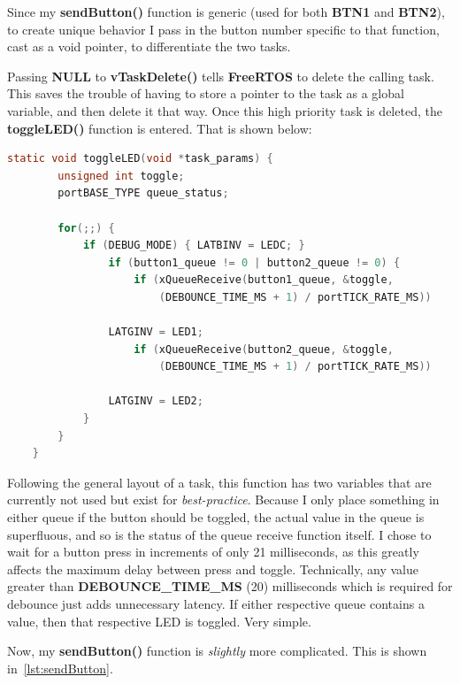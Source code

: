 \documentclass[a4paper, 12pt]{article}
\begin{document}
Since my \textbf{sendButton()} function is generic (used for both \textbf{BTN1} and \textbf{BTN2}), to create unique behavior I pass in the button number specific to that function, cast as a void pointer, to differentiate the two tasks.

Passing \textbf{NULL} to \textbf{vTaskDelete()} tells \textbf{FreeRTOS} to delete the calling task. This saves the trouble of having to store a pointer to the task as a global variable, and then delete it that way. Once this high priority task is deleted, the \textbf{toggleLED()} function is entered. That is shown below:

\newpage
	\begin{mdframed}[backgroundcolor=code-gray, roundcorner=10pt,
								innerleftmargin=5, innertopmargin=5, innerbottommargin=5]	
	\begin{lstlisting}[language=C, caption=LED Toggle Task, tabsize=2, label={lst:toggleLED}]
	static void toggleLED(void *task_params) {
		unsigned int toggle;
		portBASE_TYPE queue_status;
	
		for(;;) {
			if (DEBUG_MODE) { LATBINV = LEDC; }
				if (button1_queue != 0 | button2_queue != 0) {
					if (xQueueReceive(button1_queue, &toggle,
						(DEBOUNCE_TIME_MS + 1) / portTICK_RATE_MS))
						
				LATGINV = LED1;
					if (xQueueReceive(button2_queue, &toggle,
						(DEBOUNCE_TIME_MS + 1) / portTICK_RATE_MS))
						
				LATGINV = LED2;
			}
		}
	}
	\end{lstlisting}
	\end{mdframed}
	
Following the general layout of a task, this function has two variables that are currently not used but exist for \emph{best-practice}. Because I only place something in either queue if the button should be toggled, the actual value in the queue is superfluous, and so is the status of the queue receive function itself. I chose to wait for a button press in increments of only 21 milliseconds, as this greatly affects the maximum delay between press and toggle. Technically, any value greater than \textbf{DEBOUNCE\_TIME\_MS} (20) milliseconds which is required for debounce just adds unnecessary latency. If either respective queue contains a value, then that respective LED is toggled. Very simple.

Now, my \textbf{sendButton()} function is \emph{slightly} more complicated. This is shown in~\ref{lst:sendButton}.
\end{document}
